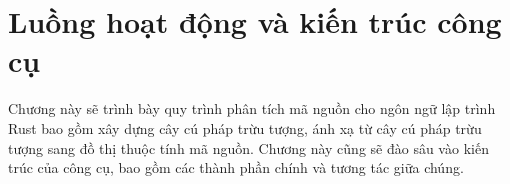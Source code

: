 \chapter{Luồng hoạt động và kiến trúc công cụ}
\label{chap:method}

Chương này sẽ trình bày quy trình phân tích mã nguồn cho ngôn ngữ lập trình Rust bao gồm xây dựng cây cú pháp trừu tượng, ánh xạ từ cây cú pháp trừu tượng sang đồ thị thuộc tính mã nguồn.
Chương này cũng sẽ đào sâu vào kiến trúc của công cụ, bao gồm các thành phần chính và tương tác giữa chúng.





